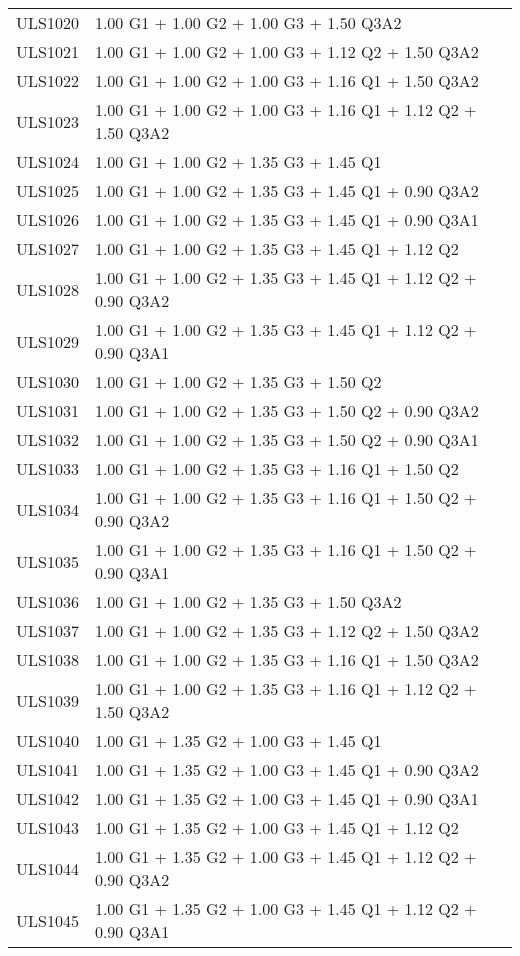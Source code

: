 \begin{center}
\begin{small}
\begin{longtable}{|l|p{10cm}|}
ULS1020 & 1.00 G1 + 1.00 G2 + 1.00 G3 + 1.50 Q3A2\\
ULS1021 & 1.00 G1 + 1.00 G2 + 1.00 G3 + 1.12 Q2 + 1.50 Q3A2\\
ULS1022 & 1.00 G1 + 1.00 G2 + 1.00 G3 + 1.16 Q1 + 1.50 Q3A2\\
ULS1023 & 1.00 G1 + 1.00 G2 + 1.00 G3 + 1.16 Q1 + 1.12 Q2 + 1.50 Q3A2\\
ULS1024 & 1.00 G1 + 1.00 G2 + 1.35 G3 + 1.45 Q1\\
ULS1025 & 1.00 G1 + 1.00 G2 + 1.35 G3 + 1.45 Q1 + 0.90 Q3A2\\
ULS1026 & 1.00 G1 + 1.00 G2 + 1.35 G3 + 1.45 Q1 + 0.90 Q3A1\\
ULS1027 & 1.00 G1 + 1.00 G2 + 1.35 G3 + 1.45 Q1 + 1.12 Q2\\
ULS1028 & 1.00 G1 + 1.00 G2 + 1.35 G3 + 1.45 Q1 + 1.12 Q2 + 0.90 Q3A2\\
ULS1029 & 1.00 G1 + 1.00 G2 + 1.35 G3 + 1.45 Q1 + 1.12 Q2 + 0.90 Q3A1\\
ULS1030 & 1.00 G1 + 1.00 G2 + 1.35 G3 + 1.50 Q2\\
ULS1031 & 1.00 G1 + 1.00 G2 + 1.35 G3 + 1.50 Q2 + 0.90 Q3A2\\
ULS1032 & 1.00 G1 + 1.00 G2 + 1.35 G3 + 1.50 Q2 + 0.90 Q3A1\\
ULS1033 & 1.00 G1 + 1.00 G2 + 1.35 G3 + 1.16 Q1 + 1.50 Q2\\
ULS1034 & 1.00 G1 + 1.00 G2 + 1.35 G3 + 1.16 Q1 + 1.50 Q2 + 0.90 Q3A2\\
ULS1035 & 1.00 G1 + 1.00 G2 + 1.35 G3 + 1.16 Q1 + 1.50 Q2 + 0.90 Q3A1\\
ULS1036 & 1.00 G1 + 1.00 G2 + 1.35 G3 + 1.50 Q3A2\\
ULS1037 & 1.00 G1 + 1.00 G2 + 1.35 G3 + 1.12 Q2 + 1.50 Q3A2\\
ULS1038 & 1.00 G1 + 1.00 G2 + 1.35 G3 + 1.16 Q1 + 1.50 Q3A2\\
ULS1039 & 1.00 G1 + 1.00 G2 + 1.35 G3 + 1.16 Q1 + 1.12 Q2 + 1.50 Q3A2\\
ULS1040 & 1.00 G1 + 1.35 G2 + 1.00 G3 + 1.45 Q1\\
ULS1041 & 1.00 G1 + 1.35 G2 + 1.00 G3 + 1.45 Q1 + 0.90 Q3A2\\
ULS1042 & 1.00 G1 + 1.35 G2 + 1.00 G3 + 1.45 Q1 + 0.90 Q3A1\\
ULS1043 & 1.00 G1 + 1.35 G2 + 1.00 G3 + 1.45 Q1 + 1.12 Q2\\
ULS1044 & 1.00 G1 + 1.35 G2 + 1.00 G3 + 1.45 Q1 + 1.12 Q2 + 0.90 Q3A2\\
ULS1045 & 1.00 G1 + 1.35 G2 + 1.00 G3 + 1.45 Q1 + 1.12 Q2 + 0.90 Q3A1\\

\end{longtable}
\end{small}
\end{center}

